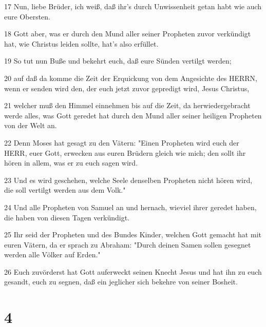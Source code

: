 \par 17 Nun, liebe Brüder, ich weiß, daß ihr's durch Unwissenheit getan habt wie auch eure Obersten.
\par 18 Gott aber, was er durch den Mund aller seiner Propheten zuvor verkündigt hat, wie Christus leiden sollte, hat's also erfüllet.
\par 19 So tut nun Buße und bekehrt euch, daß eure Sünden vertilgt werden;
\par 20 auf daß da komme die Zeit der Erquickung von dem Angesichte des HERRN, wenn er senden wird den, der euch jetzt zuvor gepredigt wird, Jesus Christus,
\par 21 welcher muß den Himmel einnehmen bis auf die Zeit, da herwiedergebracht werde alles, was Gott geredet hat durch den Mund aller seiner heiligen Propheten von der Welt an.
\par 22 Denn Moses hat gesagt zu den Vätern: "Einen Propheten wird euch der HERR, euer Gott, erwecken aus euren Brüdern gleich wie mich; den sollt ihr hören in allem, was er zu euch sagen wird.
\par 23 Und es wird geschehen, welche Seele denselben Propheten nicht hören wird, die soll vertilgt werden aus dem Volk."
\par 24 Und alle Propheten von Samuel an und hernach, wieviel ihrer geredet haben, die haben von diesen Tagen verkündigt.
\par 25 Ihr seid der Propheten und des Bundes Kinder, welchen Gott gemacht hat mit euren Vätern, da er sprach zu Abraham: "Durch deinen Samen sollen gesegnet werden alle Völker auf Erden."
\par 26 Euch zuvörderst hat Gott auferweckt seinen Knecht Jesus und hat ihn zu euch gesandt, euch zu segnen, daß ein jeglicher sich bekehre von seiner Bosheit.

\chapter{4}

